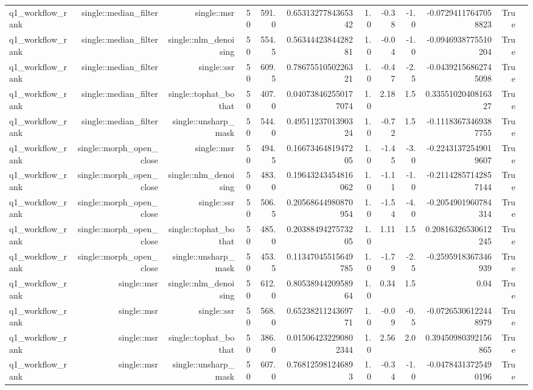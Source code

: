 \begin{tabular}{lrrrrrrrrrrr}
q1\_workflow\_rank & single::median\_filter & single::msr & 50 & 591.0 & 0.6531327784365342 & 1.0 & -0.38 & -1.0 & -0.07294117647058823 & True &  \\
q1\_workflow\_rank & single::median\_filter & single::nlm\_denoising & 50 & 554.5 & 0.5634442384428281 & 1.0 & -0.04 & -1.0 & -0.0946938775510204 & True &  \\
q1\_workflow\_rank & single::median\_filter & single::ssr & 50 & 609.5 & 0.7867551050226321 & 1.0 & -0.47 & -2.5 & -0.04392156862745098 & True &  \\
q1\_workflow\_rank & single::median\_filter & single::tophat\_bothat & 50 & 407.0 & 0.040738462550177074 & 1.0 & 2.18 & 1.5 & 0.3355102040816327 & True &  \\
q1\_workflow\_rank & single::median\_filter & single::unsharp\_mask & 50 & 544.0 & 0.4951123701390324 & 1.0 & -0.72 & 1.5 & -0.11183673469387755 & True &  \\
q1\_workflow\_rank & single::morph\_open\_close & single::msr & 50 & 494.5 & 0.1667346481947205 & 1.0 & -1.45 & -3.0 & -0.22431372549019607 & True &  \\
q1\_workflow\_rank & single::morph\_open\_close & single::nlm\_denoising & 50 & 483.0 & 0.19643243454816062 & 1.0 & -1.11 & -1.0 & -0.21142857142857144 & True &  \\
q1\_workflow\_rank & single::morph\_open\_close & single::ssr & 50 & 506.5 & 0.20568644980870954 & 1.0 & -1.54 & -4.0 & -0.2054901960784314 & True &  \\
q1\_workflow\_rank & single::morph\_open\_close & single::tophat\_bothat & 50 & 485.0 & 0.2038849427573205 & 1.0 & 1.11 & 1.5 & 0.20816326530612245 & True &  \\
q1\_workflow\_rank & single::morph\_open\_close & single::unsharp\_mask & 50 & 453.5 & 0.11347045515649785 & 1.0 & -1.79 & -2.5 & -0.2595918367346939 & True &  \\
q1\_workflow\_rank & single::msr & single::nlm\_denoising & 50 & 612.0 & 0.8053894420958964 & 1.0 & 0.34 & 1.5 & 0.04 & True &  \\
q1\_workflow\_rank & single::msr & single::ssr & 50 & 568.0 & 0.6523821124369771 & 1.0 & -0.09 & -0.5 & -0.07265306122448979 & True &  \\
q1\_workflow\_rank & single::msr & single::tophat\_bothat & 50 & 386.0 & 0.015064232290802344 & 1.0 & 2.56 & 2.0 & 0.39450980392156865 & True &  \\
q1\_workflow\_rank & single::msr & single::unsharp\_mask & 50 & 607.0 & 0.768125981246893 & 1.0 & -0.34 & -1.0 & -0.04784313725490196 & True &  \\

\end{tabular}
